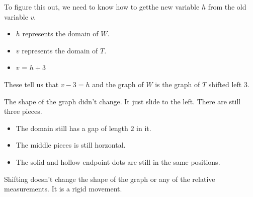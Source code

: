 \documentclass{ximera}
\begin{document}
\begin{example}
To figure this out, we need to know how to getthe new variable $h$ from the old variable $v$. \\




\begin{itemize}
\item $h$ represents the domain of $W$. 
\item $v$ represents the domain of $T$.  
\item $v$ = $h+3$
\end{itemize}


These tell us that $v-3 = h$ and the graph of $W$ is the graph of $T$ shifted left $3$.



\end{example}


The shape of the graph didn't change. It just slide to the left. There are still three pieces. \\




\begin{itemize}
\item The domain still has a gap of length $2$ in it.  
\item The middle pieces is still horzontal.  
\item The solid and hollow endpoint dots are still in the same positions. 
\end{itemize}





Shifting doesn't change the shape of the graph or any of the relative measurements. It is a rigid movement.
\end{document}
